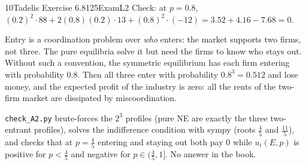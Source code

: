 \begin{exsol}{10}{Tadelis Exercise 6.8}{125}{Exam}{L2}
Check: at $p = 0.8$, $(0.2)^2\cdot 88 + 2(0.8)(0.2)\cdot 13 + (0.8)^2\cdot(-12)
= 3.52 + 4.16 - 7.68 = 0$.

\interp Entry is a coordination problem over \emph{who} enters: the market supports two firms, not
three. The pure equilibria solve it but need the firms to know who stays out. Without such a
convention, the symmetric equilibrium has each firm entering with probability $0.8$. Then all three
enter with probability $0.8^3 = 0.512$ and lose money, and the expected profit of the industry is
zero: all the rents of the two-firm market are dissipated by miscoordination.

\verify \texttt{check\_A2.py} brute-forces the $2^3$ profiles (pure NE are exactly the three
two-entrant profiles), solves the indifference condition with sympy (roots $\tfrac45$ and
$\tfrac{11}{5}$), and checks that at $p = \tfrac45$ entering and staying out both pay $0$ while
$u_i(E,p)$ is positive for $p < \tfrac45$ and negative for $p \in (\tfrac45, 1]$. No answer in the
book.

\end{exsol}
